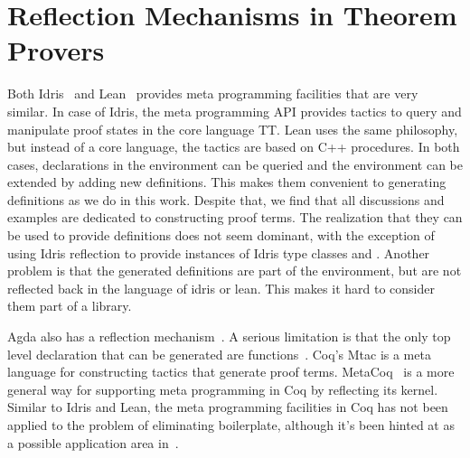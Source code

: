 \section{Reflection Mechanisms in Theorem Provers}
\label{sec:relwork:reflectionTPs}


Both Idris~\cite{brady2016reflection} and Lean~\cite{lean2017metaprogramming} provides meta programming facilities that are very similar.
In case of Idris, the meta programming API provides tactics to query and manipulate proof states in the core language TT. Lean uses the same philosophy, but instead of a core language, the tactics are based on C++ procedures. 
In both cases, declarations in the environment can be queried and the environment can be extended by adding new definitions. 
This makes them convenient to generating definitions as we do in this work. Despite that, we find that all discussions and examples are dedicated to constructing proof terms. The realization that they can be used to provide definitions does not seem dominant, with the exception of using Idris reflection to provide instances of Idris type classes  and . 
Another problem is that the generated definitions are part of the environment, but are not reflected back in the language of idris or lean. This makes it hard to consider them part of a library. 

Agda also has a reflection mechanism~\cite{van2012reflection}. A serious limitation is that the only top level declaration that can be generated are functions~\cite{agdaReflection}. 
Coq's Mtac is a meta language for constructing tactics that generate proof terms. MetaCoq~\cite{templateCoq2018} is a more general way for supporting meta programming in Coq by reflecting its kernel. Similar to Idris and Lean, the meta programming facilities in Coq has not been applied to the problem of eliminating boilerplate, although it's been hinted at as a possible application area in~\cite{templateCoq2018}. 


